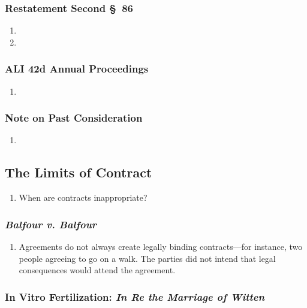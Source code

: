 \subsubsection{Restatement Second \S\ 86}

\begin{enumerate}
    \item %
    \item %
\end{enumerate}

\subsubsection{ALI 42d Annual Proceedings}

\begin{enumerate}
    \item %
\end{enumerate}

\subsubsection{Note on Past Consideration}

\begin{enumerate}
    \item %
\end{enumerate}

\subsection{The Limits of Contract}

\begin{enumerate}
    \item When are contracts inappropriate?
\end{enumerate}

\subsubsection{\emph{Balfour v. Balfour}}

\begin{enumerate}
    \item Agreements do not always create legally binding contracts---for 
    instance, two people agreeing to go on a walk. The parties did not intend 
    that legal consequences would attend the agreement.
\end{enumerate}

\subsubsection{In Vitro Fertilization: \emph{In Re the Marriage of Witten}}

